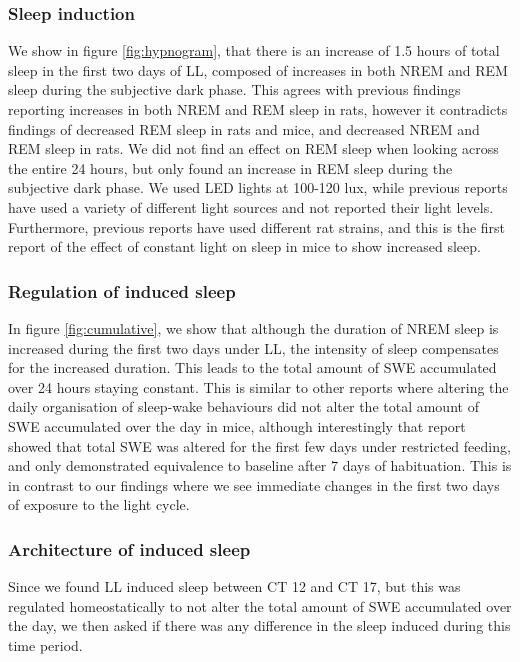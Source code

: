 \subsubsection{Sleep induction}
We show in figure \ref{fig:hypnogram}, that there is an increase of 
1.5 hours of total sleep in the first two days of LL, composed of 
increases in both NREM and REM sleep during the subjective dark phase. 
This agrees with previous findings reporting increases in both 
NREM and REM sleep in rats\cite{borbely_circadian_1978, lobo_hypoprolactinemic_1999},
however it contradicts findings of decreased REM sleep
in rats and mice\cite{mitler_sleep_1977, stephenson_sleep-wake_2012},
and decreased NREM and REM sleep in rats\cite{fishman_rem_1972}.
We did not find an effect on REM sleep when looking across the 
entire 24 hours, but only found an increase in REM sleep during the 
subjective dark phase.
We used LED lights at 100-120 lux, while previous reports have used a 
variety of different light sources and not reported their light levels.
Furthermore, previous reports have used different rat strains,
and this is the first report of the effect of constant light on 
sleep in mice to show increased sleep.
\subsubsection{Regulation of induced sleep}
In figure \ref{fig:cumulative},
we show that although the duration of NREM sleep is increased 
during the first two days under LL, 
the intensity of sleep compensates for the increased 
duration.
This leads to the total amount of SWE accumulated over 24 hours staying 
constant.
This is similar to other reports where altering the daily 
organisation of sleep-wake behaviours did not alter the total
amount of SWE accumulated over the day in mice\cite{northeast_sleep_2019},
although interestingly that report showed that total SWE was 
altered for the first few days under restricted feeding, and only
demonstrated equivalence to baseline after 7 days of habituation.
This is in contrast to our findings where we see immediate changes 
in the first two days of exposure to the light cycle.

\subsubsection{Architecture of induced sleep}
Since we found LL induced sleep between CT 12 and CT 17, but this was 
regulated homeostatically to not alter the total amount of
SWE accumulated over the day, we then asked if there was any 
difference in the sleep induced during this time period. 

